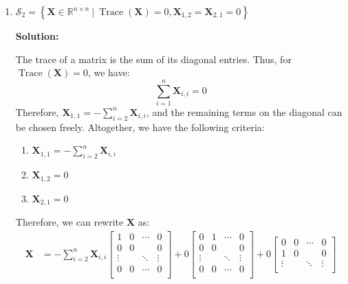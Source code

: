 \begin{enumerate}[label=(\alph*)]
	\item $\mathcal{S}_2 = \left\{ \mathbf{X}
		      \in \mathbb{R}^{n \times n} \ | \
		      \operatorname{Trace}(\mathbf{X}) = 0,
		      \mathbf{X}_{1,2} = \mathbf{X}_{2,1} = 0
		      \right\}$
	      \begin{tcolorbox}
		      \textbf{Solution:} \par
		      The trace of a matrix is the sum of its diagonal entries. Thus,
		      for $\operatorname{Trace}(\mathbf{X}) = 0$, we have:
		      $$
			      \sum_{i=1}^{n} \mathbf{X}_{i,i} = 0
		      $$
		      Therefore, $\mathbf{X}_{1,1} = -\sum_{i=2}^{n} \mathbf{X}_{i,i}$,
		      and the remaining terms on the diagonal can be chosen freely.
		      Altogether, we have the following criteria:
		      \begin{enumerate}
			      \item $\mathbf{X}_{1,1} = -\sum_{i=2}^{n} \mathbf{X}_{i,i}$
			      \item $\mathbf{X}_{1,2} = 0$
			      \item $\mathbf{X}_{2,1} = 0$
		      \end{enumerate}
		      Therefore, we can rewrite $\mathbf{X}$ as:
		      $$
			      \begin{aligned}
				      \mathbf{X} & =
				      -\sum_{i=2}^{n} \mathbf{X}_{i,i}
				      \begin{bmatrix}
					      1      & 0 & \cdots & 0      \\
					      0      & 0 &        & 0      \\
					      \vdots &   & \ddots & \vdots \\
					      0      & 0 & \cdots & 0      \\
				      \end{bmatrix}
				      +
				      0
				      \begin{bmatrix}
					      0      & 1 & \cdots & 0      \\
					      0      & 0 &        & 0      \\
					      \vdots &   & \ddots & \vdots \\
					      0      & 0 & \cdots & 0      \\
				      \end{bmatrix}
				      +
				      0
				      \begin{bmatrix}
					      0      & 0 & \cdots & 0      \\
					      1      & 0 &        & 0      \\
					      \vdots &   & \ddots & \vdots \\

\end{bmatrix}
\end{aligned}$$
\end{tcolorbox}
\end{enumerate}
